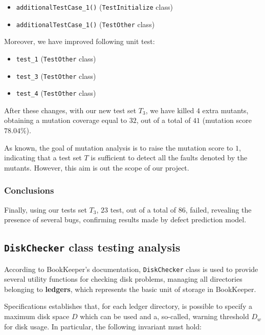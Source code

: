 \documentclass[sigconf]{acmart}
\begin{document}
\begin{itemize}
\item \texttt{additionalTestCase\_1()} (\texttt{TestInitialize} class)
\item \texttt{additionalTestCase\_1()} (\texttt{TestOther} class)
\end{itemize}

Moreover, we have improved following unit test:

\begin{itemize}
\item \texttt{test\_1} (\texttt{TestOther} class)
\item \texttt{test\_3} (\texttt{TestOther} class)
\item \texttt{test\_4} (\texttt{TestOther} class)
\end{itemize}

After these changes, with our new test set $T_3$, we have killed $4$ extra mutants, obtaining a mutation coverage equal to $32$, out of a total of $41$ (mutation score $78.04 \%$).

As known, the goal of mutation analysis is to raise the mutation score to $1$, indicating that a test set $T$ is sufficient to detect all the faults denoted by the mutants\cite{mutation}. However, this aim is out the scope of our project.

\subsubsection{Conclusions}

Finally, using our tests set $T_3$, $23$ test, out of a total of $86$, failed, revealing the presence of several bugs, confirming results made by defect prediction model.

\subsection{\texttt{DiskChecker} class testing analysis}

According to BookKeeper's documentation, \texttt{DiskChecker} class is used to provide several utility functions for checking disk problems, managing all directories belonging to \textbf{ledgers}, which represents the basic unit of storage in BookKeeper\cite{BookKeeperArchitecture}. 

Specifications establishes that, for each ledger directory, is possible to specify a maximum disk space $D$ which can be used and a, so-called, warning threshold $D_w$ for disk usage\cite{BookKeeperConfiguration}. In particular, the following invariant must hold:
\end{document}
